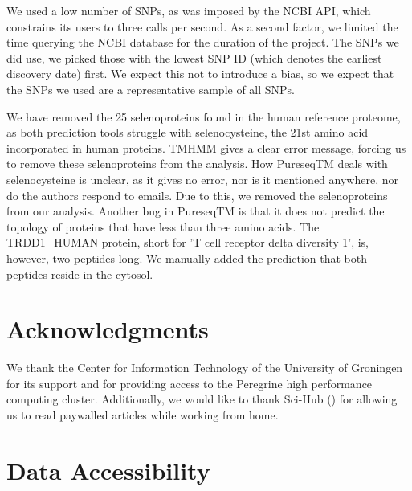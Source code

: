 We used a low number of SNPs, as was imposed by the
NCBI API, which constrains its users to three calls per second.
As a second factor, we limited the time querying the NCBI database
for the duration of the project.
The SNPs we did use, we picked those
with the lowest SNP ID (which denotes the earliest discovery date) first.
We expect this not to introduce a bias, so we expect that
the SNPs we used are a representative sample of all SNPs.

We have removed the 25 selenoproteins found in the human
reference proteome, as both prediction tools struggle with 
selenocysteine, the 21st amino acid incorporated in human proteins.
TMHMM gives a clear error message, forcing us to remove
these selenoproteins from the analysis.
How PureseqTM deals with selenocysteine is unclear,
as it gives no error, nor is it mentioned anywhere,
nor do the authors respond to emails. Due to this, we removed the
selenoproteins from our analysis.
Another bug in PureseqTM is that it does not predict the topology
of proteins that have less than three amino acids. 
The TRDD1_HUMAN protein, short for 'T cell receptor delta diversity 1',
is, however, two peptides long. We manually added the prediction
that both peptides reside in the cytosol.


\section{Acknowledgments}

We thank the Center for Information Technology of the University 
of Groningen for its support and for providing access to the Peregrine 
high performance computing cluster. 
Additionally, we would like to thank Sci-Hub (\cite{himmelstein2018sci})
for allowing us to read paywalled articles while working from home.

\section{Data Accessibility}

